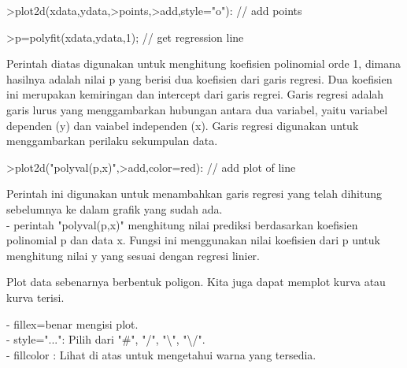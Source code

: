 \documentclass[a4paper,10pt]{article}
\begin{document}
\begin{eulernotebook}
\begin{eulercomment}
\begin{eulercomment}
\begin{eulercomment}
\begin{eulercomment}
\begin{eulercomment}
\end{eulercomment}
\begin{eulerprompt}
>plot2d(xdata,ydata,>points,>add,style="o"): // add points
\end{eulerprompt}
\begin{eulerprompt}
>p=polyfit(xdata,ydata,1); // get regression line
\end{eulerprompt}
\begin{eulercomment}
Perintah diatas digunakan untuk menghitung koefisien polinomial orde
1, dimana hasilnya adalah nilai p yang berisi dua koefisien dari garis
regresi. Dua koefisien ini merupakan kemiringan dan intercept dari
garis regrei. Garis regresi adalah garis lurus yang menggambarkan
hubungan antara dua variabel, yaitu variabel dependen (y) dan vaiabel
independen (x). Garis regresi digunakan untuk menggambarkan perilaku
sekumpulan data.
\end{eulercomment}
\begin{eulerprompt}
>plot2d("polyval(p,x)",>add,color=red): // add plot of line
\end{eulerprompt}
\begin{eulercomment}
Perintah ini digunakan untuk menambahkan garis regresi yang telah
dihitung sebelumnya ke dalam grafik yang sudah ada.\\
- perintah "polyval(p,x)" menghitung nilai prediksi berdasarkan
koefisien polinomial p dan data x. Fungsi ini menggunakan nilai
koefisien dari p untuk menghitung nilai y yang sesuai dengan regresi
linier.

\begin{eulercomment}
\begin{eulercomment}
Plot data sebenarnya berbentuk poligon. Kita juga dapat memplot kurva
atau kurva terisi.

- fillex=benar mengisi plot.\\
- style="...": Pilih dari "#", "/", "\textbackslash{}", "\textbackslash{}/".\\
- fillcolor : Lihat di atas untuk mengetahui warna yang tersedia.


\end{eulercomment}
\end{eulercomment}
\end{eulercomment}
\end{eulercomment}
\end{eulercomment}
\end{eulercomment}
\end{eulercomment}
\end{eulernotebook}
\end{document}
